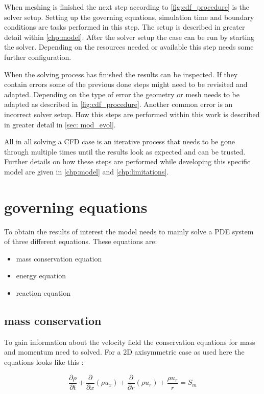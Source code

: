 \documentclass[../thesis.tex]{subfiles}
\begin{document}
When meshing is finished the next step according to \autoref{fig:cdf_procedure} is the solver setup. Setting up the governing equations, simulation time and boundary conditions are tasks performed in this step. The setup is described in greater detail within \autoref{chp:model}. After the solver setup the case can be run by starting the solver. Depending on the resources needed or available this step needs some further configuration.

When the solving process has finished the results can be inspected. If they contain errors some of the previous done steps might need to be revisited and adapted. Depending on the type of error the geometry or mesh needs to be adapted as described in \autoref{fig:cdf_procedure}. Another common error is an incorrect solver setup. How this steps are performed within this work is described in greater detail in \autoref{sec: mod_evol}. 

All in all solving a CFD case is an iterative process that needs to be gone through multiple times until the results look as expected and can be trusted. Further details on how these steps are performed while developing this specific model are given in \autoref{chp:model} and \autoref{chp:limitations}.

\section{governing equations}
\label{sec:gov_eqn}
To obtain the results of interest the model needs to mainly solve a PDE system of three different equations. These equations are:
\begin{itemize}
	\item mass conservation equation
	\item energy equation
	\item reaction equation
\end{itemize}

\subsection{mass conservation}
To gain information about the velocity field the conservation equations for mass and momentum need to solved. For a 2D axisymmetric case as used here the equations looks like this \cite{manual2009ansys}:

\begin{equation}
\label{eqn:ansys_conti}
\dfrac{\partial \rho}{\partial t} + \dfrac{\partial}{\partial x} (\rho u_x) + \dfrac{\partial }{\partial r} (\rho u_r)
+ \dfrac{\rho u_r}{r} = S_m
\end{equation}
\end{document}
